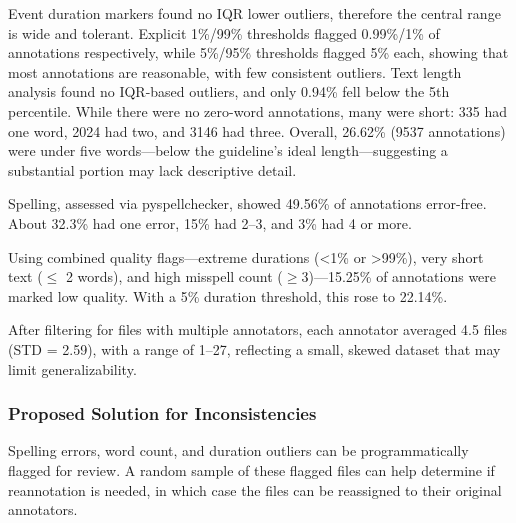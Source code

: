 \documentclass{article}
\begin{document}
Event duration markers found no IQR lower outliers, therefore the central range is wide and tolerant. Explicit 1\%/99\% thresholds flagged 0.99\%/1\% of annotations respectively, while 5\%/95\% thresholds flagged 5\% each, showing that most annotations are reasonable, with few consistent outliers. Text length analysis found no IQR-based outliers, and only 0.94\% fell below the 5th percentile. While there were no zero-word annotations, many were short: 335 had one word, 2024 had two, and 3146 had three. Overall, 26.62\% (9537 annotations) were under five words—below the guideline's ideal length—suggesting a substantial portion may lack descriptive detail.

\begin{table}[H]
  \caption{Word Count Outcomes}
  \label{tab:word_outcomes}
  \centering
\end{table}

Spelling, assessed via pyspellchecker, showed 49.56\% of annotations error-free. About 32.3\% had one error, 15\% had 2–3, and 3\% had 4 or more.

Using combined quality flags—extreme durations (<1\% or >99\%), very short text ($\leq$ 2 words), and high misspell count ($\geq$3)—15.25\% of annotations were marked low quality. With a 5\% duration threshold, this rose to 22.14\%.

After filtering for files with multiple annotators, each annotator averaged 4.5 files (STD = 2.59), with a range of 1–27, reflecting a small, skewed dataset that may limit generalizability.

\subsubsection{Proposed Solution for Inconsistencies}

Spelling errors, word count, and duration outliers can be programmatically flagged for review. A random sample of these flagged files can help determine if reannotation is needed, in which case the files can be reassigned to their original annotators.
\end{document}
